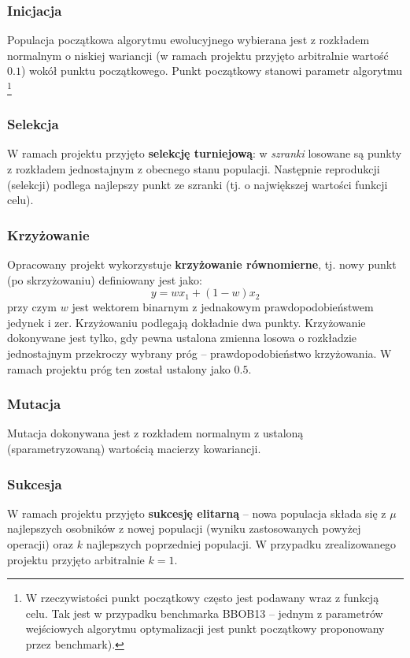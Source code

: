 \documentclass[runningheads]{llncs}
\begin{document}
\subsubsection{Inicjacja}

Populacja początkowa algorytmu ewolucyjnego wybierana jest z rozkładem 
normalnym o niskiej wariancji (w ramach projektu przyjęto arbitralnie 
wartość $0.1$) wokół punktu początkowego. Punkt początkowy stanowi parametr 
algorytmu \footnote{W rzeczywistości punkt początkowy często jest podawany wraz 
z funkcją celu. Tak jest w przypadku benchmarka BBOB13 -- jednym z 
parametrów wejściowych algorytmu optymalizacji jest punkt początkowy 
proponowany przez benchmark).}

\subsubsection{Selekcja}
W ramach projektu przyjęto \textbf{selekcję turniejową}: w \emph{szranki} 
losowane są punkty z rozkładem jednostajnym z obecnego stanu populacji. 
Następnie reprodukcji (selekcji) podlega najlepszy punkt ze szranki (tj. o 
największej wartości funkcji celu).

\subsubsection{Krzyżowanie}
Opracowany projekt wykorzystuje \textbf{krzyżowanie równomierne}, tj. nowy 
punkt (po skrzyżowaniu) definiowany jest jako:
\begin{equation}
 y = wx_1 + (1-w)x_2
\end{equation}
przy czym $w$ jest wektorem binarnym z jednakowym prawdopodobieństwem jedynek i 
zer. Krzyżowaniu podlegają dokładnie dwa punkty. Krzyżowanie dokonywane jest 
tylko, gdy pewna ustalona zmienna losowa o rozkładzie jednostajnym przekroczy 
wybrany próg -- prawdopodobieństwo krzyżowania. W ramach projektu próg ten 
został ustalony jako $0.5$.

\subsubsection{Mutacja}
Mutacja dokonywana jest z rozkładem normalnym z ustaloną (sparametryzowaną) 
wartością macierzy kowariancji.

\subsubsection{Sukcesja}
W ramach projektu przyjęto \textbf{sukcesję elitarną} -- nowa populacja składa 
się z $\mu$ najlepszych osobników z nowej populacji (wyniku zastosowanych 
powyżej operacji) oraz $k$ najlepszych poprzedniej populacji. W przypadku 
zrealizowanego projektu przyjęto arbitralnie $k=1$.
\end{document}
